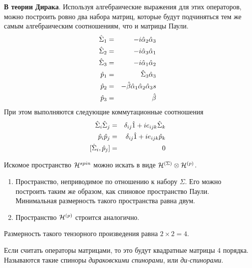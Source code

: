 \textbf{В теории Дирака}. Используя алгебраические выражения для этих операторов, можно построить ровно два набора матриц, которые будут подчиняться тем же самым алгебраическим соотношениям, что и матрицы Паули.
\begin{eqnarray*}
    \hat \Sigma_1 &=& - i \hat \alpha_2 \hat \alpha_3\\
    \hat \Sigma_2 &=& - i \hat \alpha_3 \hat \alpha_1\\
    \hat \Sigma_3 &=& - i \hat \alpha_1 \hat \alpha_2\\
    \hat p_1 &=& \Hat \Sigma_3 \hat \alpha_3\\
    \hat p_2 &=& - \hat \beta \hat \alpha_1 \hat \alpha_2 \hat \alpha_3s\\
    \hat p_3 &=& \hat \beta
\end{eqnarray*}
При этом выполняются следующие коммутационные соотношения
\begin{eqnarray*}
    \hat \Sigma_i \hat \Sigma_j &=& \delta_{ij} \hat 1 + i e_{ijk} \hat \Sigma_k\\
    \hat p_i \hat p_j &=& \delta_{ij} \hat 1 + i e_{ijk} \hat p_k\\
    {}[\Hat \Sigma_i, \hat p_j] &=& 0
\end{eqnarray*}

Искомое пространство $\mathcal H^{spin}$ можно искать в виде $\mathcal H^{(\Sigma)} \otimes \mathcal H^{(p)}$.

\begin{enumerate}
  \item Пространство, неприводимое по отношению к набору $\Sigma$. Его можно построить таким же образом, как спиновое пространство Паули. Минимальная размерность такого пространства равна двум.

  \item Пространство $\mathcal H^{(p)}$ строится аналогично.
\end{enumerate}
Размерность такого тензорного произведения равна $2 \times 2 = 4$.

Если считать операторы матрицами, то это будут квадратные матрицы $4$ порядка. Называются такие спиноры \emph{дираковскими спинорами}, или \emph{ди-спинорами}.

